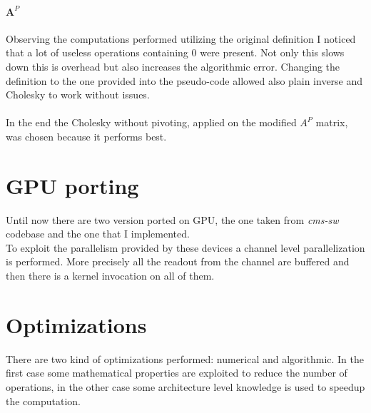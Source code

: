 \paragraph{$\boldsymbol A^P$} Observing the computations performed utilizing the original definition I noticed that a lot of useless operations containing $0$ were present. Not only this slows down this is overhead but also increases the algorithmic error. Changing the definition to the one provided into the pseudo-code allowed also plain inverse and Cholesky to work without issues.
\paragraph*{}
In the end the Cholesky without pivoting, applied on the modified $A^P$ matrix, was chosen because it performs best.

\section{GPU porting}
Until now there are two version ported on GPU, the one taken from \textit{cms-sw} codebase and the one that I implemented. \\
To exploit the parallelism provided by these devices a channel level parallelization is performed. More precisely all the readout from the channel are buffered and then there is a kernel invocation on all of them.

\section{Optimizations}
There are two kind of optimizations performed: numerical and algorithmic. In the first case some mathematical properties are exploited to reduce the number of operations, in the other case some architecture level knowledge is used to speedup the computation.
